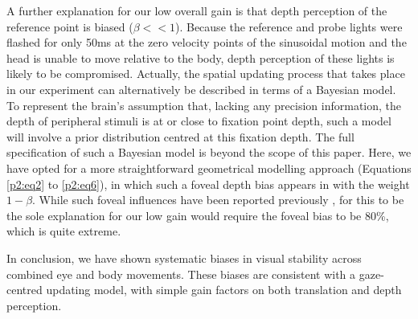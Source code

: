 A further explanation for our low overall gain is that depth perception of the reference point is biased ($\beta << 1$). Because the reference and probe lights were flashed for only 50ms at the zero velocity points of the sinusoidal motion and the head is unable to move relative to the body, depth perception of these lights is likely to be compromised. Actually, the spatial updating process that takes place in our experiment can alternatively be described in terms of a Bayesian model. To represent the brain's assumption that, lacking any precision information, the depth of peripheral stimuli is at or close to fixation point depth, such a model will involve a prior distribution centred at this fixation depth. The full specification of such a Bayesian model is beyond the scope of this paper. Here, we have opted for a more straightforward geometrical modelling approach (Equations \ref{p2:eq2} to \ref{p2:eq6}), in which such a foveal depth bias appears in  with the weight $1 - \beta$. While such foveal influences have been reported previously \cite{brenner2008, mateeff1983}, for this to be the sole explanation for our low gain would require the foveal bias to be 80\%, which is quite extreme.

In conclusion, we have shown systematic biases in visual stability across combined eye and body movements. These biases are consistent with a gaze-centred updating model, with simple gain factors on both translation and depth perception.
